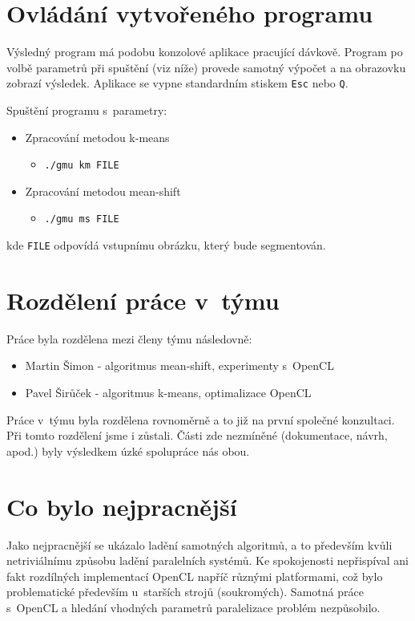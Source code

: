 \documentclass[11pt,a4paper]{article}
\begin{document}
\section{Ovládání vytvořeného programu}
Výsledný program má podobu konzolové aplikace pracující dávkově. Program po volbě parametrů při spuštění (viz níže) provede samotný výpočet a na obrazovku zobrazí výsledek. Aplikace se vypne standardním stiskem \texttt{Esc} nebo \texttt{Q}.

Spuštění programu s~parametry:
\begin{itemize}
  \item Zpracování metodou k-means 
    \begin{itemize}
      \item[] \texttt{./gmu km FILE}
    \end{itemize}
  \item Zpracování metodou mean-shift
    \begin{itemize}
      \item[] \texttt{./gmu ms FILE}
    \end{itemize}
\end{itemize}
kde \texttt{FILE} odpovídá vstupnímu obrázku, který bude segmentován.


\section{Rozdělení práce v~týmu}
Práce byla rozdělena mezi členy týmu následovně:
\begin{itemize}
\item Martin Šimon - algoritmus mean-shift, experimenty s~OpenCL
\item Pavel Širůček - algoritmus k-means, optimalizace OpenCL
\end{itemize}

Práce v~týmu byla rozdělena rovnoměrně a to již na první společné konzultaci. Při tomto rozdělení jsme i zůstali. Části zde nezmíněné (dokumentace, návrh, apod.) byly výsledkem úzké spolupráce nás obou.

\section{Co bylo nejpracnější}
Jako nejpracnější se ukázalo ladění samotných algoritmů, a to především kvůli netriviálnímu způsobu ladění paralelních systémů. Ke spokojenosti nepřispíval ani fakt rozdílných implementací OpenCL napříč různými platformami, což bylo problematické především u~starších strojů (soukromých). Samotná práce s~OpenCL a hledání vhodných parametrů paralelizace problém nezpůsobilo.
\end{document}
